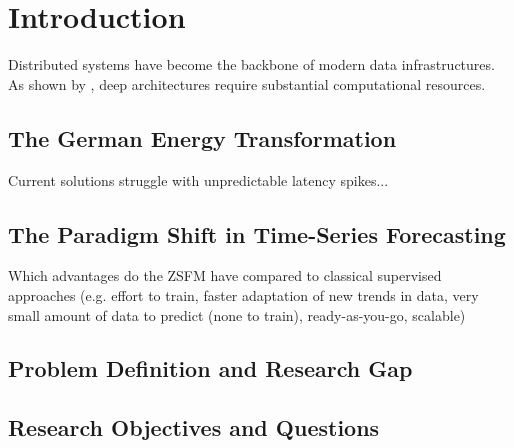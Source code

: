 \chapter{Introduction}
\label{chap:introduction}

Distributed systems have become the backbone of modern data infrastructures. As shown by \textcite{vaswani2017attention}, deep architectures require substantial computational resources.


\section{The German Energy Transformation}
\label{sec:contextGermanEnergy}

Current solutions struggle with unpredictable latency spikes...


\section{The Paradigm Shift in Time-Series Forecasting}
\label{sec:paradigmShift}

Which advantages do the ZSFM have compared to classical supervised approaches (e.g. effort to train, faster adaptation of new trends in data, very small amount of data to predict (none to train), ready-as-you-go, scalable)


\section{Problem Definition and Research Gap}
\label{sec:problemStatement}


\section{Research Objectives and Questions}
\label{sec:researchQuestions}
